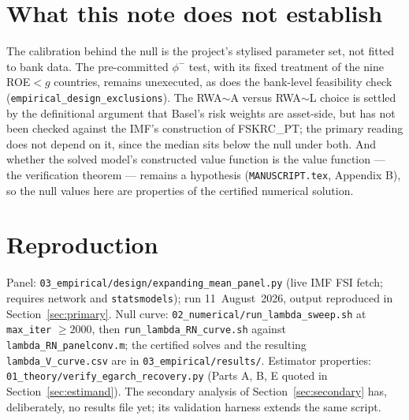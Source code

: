 \documentclass[11pt]{article}
\begin{document}
\section{What this note does not establish}
\label{sec:limits}

The calibration behind the null is the project's stylised parameter set,
not fitted to bank data. The pre-committed $\phi^-$ test, with its fixed
treatment of the nine ROE${}<g$ countries, remains unexecuted, as does
the bank-level feasibility check
(\texttt{empirical\_design\_exclusions}). The RWA$\sim$A versus
RWA$\sim$L choice is settled by the definitional argument that Basel's
risk weights are asset-side, but has not been checked against the IMF's
construction of FSKRC\_PT; the primary reading does not depend on it,
since the median sits below the null under both. And whether the solved
model's constructed value function is the value function --- the
verification theorem --- remains a hypothesis (\texttt{MANUSCRIPT.tex},
Appendix B), so the null values here are properties of the certified
numerical solution.

\section{Reproduction}
\label{sec:repro}

Panel: \texttt{03\_empirical/design/expanding\_mean\_panel.py} (live IMF
FSI fetch; requires network and \texttt{statsmodels}); run
11~August~2026, output reproduced in Section~\ref{sec:primary}. Null
curve: \texttt{02\_numerical/run\_lambda\_sweep.sh} at
\texttt{max\_iter} $\ge 2000$, then
\texttt{run\_lambda\_RN\_curve.sh} against
\texttt{lambda\_RN\_panelconv.m}; the certified solves and the resulting
\texttt{lambda\_V\_curve.csv} are in \texttt{03\_empirical/results/}.
Estimator properties: \texttt{01\_theory/verify\_egarch\_recovery.py}
(Parts A, B, E quoted in Section~\ref{sec:estimand}). The secondary
analysis of Section~\ref{sec:secondary} has, deliberately, no results
file yet; its validation harness extends the same script.
\end{document}

